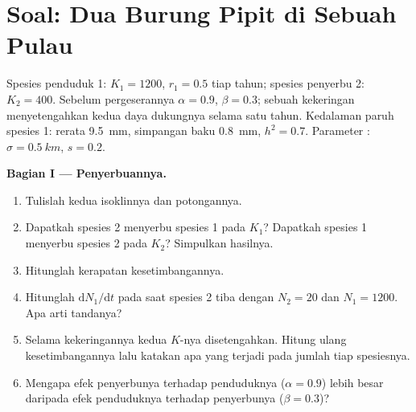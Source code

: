 \section{Soal: Dua Burung Pipit di Sebuah Pulau}

\begin{problem}
\label{pb:b2:speciation:1}
Spesies penduduk 1: $K_1 = 1200$, $r_1 = 0.5$ tiap tahun; spesies
penyerbu 2: $K_2 = 400$. Sebelum pergeserannya $\alpha = 0.9$, $\beta =
0.3$; sebuah kekeringan menyetengahkan kedua daya dukungnya selama satu
tahun. Kedalaman paruh spesies 1: rerata \qty{9.5}{mm}, simpangan baku
\qty{0.8}{mm}, $h^{2} = 0.7$. Parameter : $\sigma =
\qty{0.5}{km}$, $s = 0.2$.

\medskip
\noindent\textbf{Bagian I --- Penyerbuannya.}
\begin{enumerate}
  \item Tulislah kedua isoklinnya dan potongannya.
  \item Dapatkah spesies 2 menyerbu spesies 1 pada $K_1$? Dapatkah
        spesies 1 menyerbu spesies 2 pada $K_2$? Simpulkan hasilnya.
  \item Hitunglah kerapatan kesetimbangannya.
  \item Hitunglah $\mathrm{d}N_1/\mathrm{d}t$ pada saat spesies 2 tiba
        dengan $N_2 = 20$ dan $N_1 = 1200$. Apa arti tandanya?
  \item Selama kekeringannya kedua $K$-nya disetengahkan. Hitung ulang
        kesetimbangannya lalu katakan apa yang terjadi pada jumlah tiap
        spesiesnya.
  \item Mengapa efek penyerbunya terhadap penduduknya ($\alpha = 0.9$)
        lebih besar daripada efek penduduknya terhadap penyerbunya
        ($\beta = 0.3$)?
\end{enumerate}


\end{problem}
